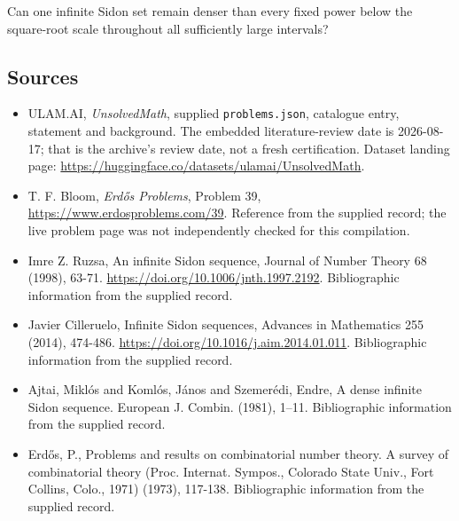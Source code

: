 \documentclass[11pt,a4paper]{article}
\begin{document}
Can one infinite Sidon set remain denser than every fixed power below the square-root scale throughout all sufficiently large intervals?

\subsection{Sources}

{\small

\begin{itemize}

\item[\hypertarget{source:statement:1}{S1}] ULAM.AI, \emph{UnsolvedMath}, supplied \texttt{problems.json}, catalogue entry, statement and background. The embedded literature-review date is 2026-08-17; that is the archive’s review date, not a fresh certification. Dataset landing page: \url{https://huggingface.co/datasets/ulamai/UnsolvedMath}.

\item[\hypertarget{source:statement:2}{S2}] T. F. Bloom, \emph{Erdős Problems}, Problem 39, \url{https://www.erdosproblems.com/39}. Reference from the supplied record; the live problem page was not independently checked for this compilation.

\item[\hypertarget{source:statement:3}{S3}] Imre Z. Ruzsa, An infinite Sidon sequence, Journal of Number Theory 68 (1998), 63-71. \url{https://doi.org/10.1006/jnth.1997.2192}. Bibliographic information from the supplied record.

\item[\hypertarget{source:statement:4}{S4}] Javier Cilleruelo, Infinite Sidon sequences, Advances in Mathematics 255 (2014), 474-486. \url{https://doi.org/10.1016/j.aim.2014.01.011}. Bibliographic information from the supplied record.

\item[\hypertarget{source:statement:5}{S5}] Ajtai, Mikl\'os and Koml\'os, J\'anos and Szemer\'{e}di, Endre, A dense infinite {S}idon sequence. European J. Combin. (1981), 1--11. Bibliographic information from the supplied record.

\item[\hypertarget{source:statement:6}{S6}] Erd\H{o}s, P., Problems and results on combinatorial number theory. A survey of combinatorial theory (Proc. Internat. Sympos., Colorado State Univ., Fort Collins, Colo., 1971) (1973), 117-138. Bibliographic information from the supplied record.

\end{itemize}

}

\label{end:statement}
\end{document}
